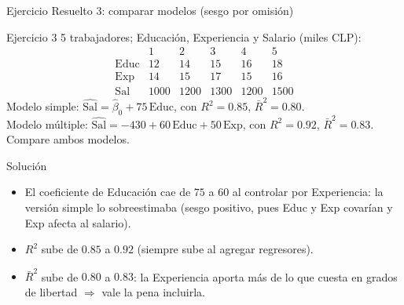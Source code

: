 \documentclass{beamer}
\begin{document}
\begin{frame}{Ejercicio Resuelto 3: comparar modelos (sesgo por omisión)}

\begin{block}{Ejercicio 3}
5 trabajadores; Educación, Experiencia y Salario (miles CLP):
\[
\begin{array}{c|ccccc}
 & 1 & 2 & 3 & 4 & 5\\\hline
\text{Educ} & 12 & 14 & 15 & 16 & 18\\
\text{Exp}  & 14 & 15 & 17 & 15 & 16\\
\text{Sal}  & 1000 & 1200 & 1300 & 1200 & 1500
\end{array}
\]
Modelo simple: $\widehat{\text{Sal}} = \hat{\beta}_0 + 75\,\text{Educ}$, con $R^2=0.85$, $\bar{R}^2=0.80$.\\
Modelo múltiple: $\widehat{\text{Sal}} = -430 + 60\,\text{Educ} + 50\,\text{Exp}$, con $R^2=0.92$, $\bar{R}^2=0.83$.
Compare ambos modelos.
\end{block}

\pause

\begin{exampleblock}{Solución}
\begin{itemize}
    \item El coeficiente de Educación cae de $75$ a $60$ al controlar por Experiencia: la versión simple lo \alert{sobreestimaba} (sesgo positivo, pues Educ y Exp covarían y Exp afecta al salario).
    \item $R^2$ sube de $0.85$ a $0.92$ (siempre sube al agregar regresores).
    \item $\bar{R}^2$ sube de $0.80$ a $0.83$: la Experiencia aporta más de lo que cuesta en grados de libertad $\Rightarrow$ vale la pena incluirla.
\end{itemize}
\end{exampleblock}

\end{frame}
\end{document}
